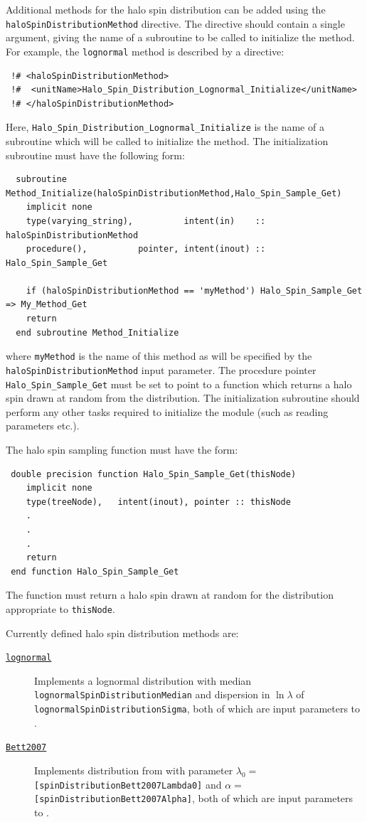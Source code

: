 Additional methods for the halo spin distribution can be added using the {\tt haloSpinDistributionMethod} directive. The directive should contain a single argument, giving the name of a subroutine to be called to initialize the method. For example, the {\tt lognormal} method is described by a directive:
\begin{verbatim}
 !# <haloSpinDistributionMethod>
 !#  <unitName>Halo_Spin_Distribution_Lognormal_Initialize</unitName>
 !# </haloSpinDistributionMethod>
\end{verbatim}
Here, {\tt Halo\_Spin\_Distribution\_Lognormal\_Initialize} is the name of a subroutine which will be called to initialize the method. The initialization subroutine must have the following form:
\begin{verbatim}
  subroutine Method_Initialize(haloSpinDistributionMethod,Halo_Spin_Sample_Get)
    implicit none
    type(varying_string),          intent(in)    :: haloSpinDistributionMethod
    procedure(),          pointer, intent(inout) :: Halo_Spin_Sample_Get
    
    if (haloSpinDistributionMethod == 'myMethod') Halo_Spin_Sample_Get => My_Method_Get
    return
  end subroutine Method_Initialize
\end{verbatim}
where {\tt myMethod} is the name of this method as will be specified by the {\tt haloSpinDistributionMethod} input parameter. The procedure pointer {\tt Halo\_Spin\_Sample\_Get} must be set to point to a function which returns a halo spin drawn at random from the distribution. The initialization subroutine should perform any other tasks required to initialize the module (such as reading parameters etc.).

The halo spin sampling function must have the form:
\begin{verbatim}
 double precision function Halo_Spin_Sample_Get(thisNode)
    implicit none
    type(treeNode),   intent(inout), pointer :: thisNode
    .
    .
    .
    return
 end function Halo_Spin_Sample_Get
\end{verbatim}
The function must return a halo spin drawn at random for the distribution appropriate to {\tt thisNode}. 

Currently defined halo spin distribution methods are:
\begin{description}
 \item [\hyperlink{dark_matter_halos.spins.distributions.lognormal.F90:halo_spin_distributions_lognormal:halo_spin_distribution_lognormal}{{\tt lognormal}}] Implements a lognormal distribution with median {\tt lognormalSpinDistributionMedian} and dispersion in $\ln\lambda$ of {\tt lognormalSpinDistributionSigma}, both of which are input parameters to \glc.
 \item [\hyperlink{dark_matter_halos.spins.distributions.Bett2007.F90:halo_spin_distributions_bett2007}{{\tt Bett2007}}] Implements distribution from \cite{bett_spin_2007} with parameter $\lambda_0=${\tt [spinDistributionBett2007Lambda0]} and $\alpha=${\tt [spinDistributionBett2007Alpha]}, both of which are input parameters to \glc.
\end{description}

